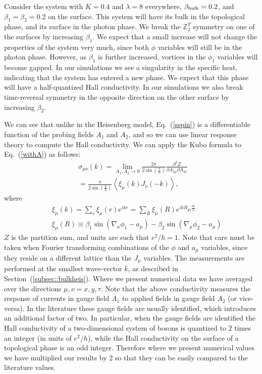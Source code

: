 \documentclass[prb,twocolumn]{revtex4-1}
\def\ztwot{\mathbb{Z}_2^T}
\begin{document}
Consider the system with $K=0.4$ and $\lambda=8$ everywhere, $\beta_{\rm bulk}=0.2$, and $\beta_{1}=\beta_{2}=0.2$ on the surface. This system will have its bulk in the topological phase, and its surface in the photon phase. We break the $\ztwot$ symmetry on one of the surfaces by increasing $\beta_{1}$. We expect that a small increase will not change the properties of the system very much, since both $\phi$ variables will still be in the photon phase.\cite{LesikAshvin2} However, as $\beta_1$ is further increased, vortices in the $\phi_1$ variables will become gapped. In our simulations we see a singularity in the specific heat, indicating that the system has entered a new phase. We expect that this phase will have a half-quantized Hall conductivity. In our simulations we also break time-reversal symmetry in the opposite direction on the other surface by increasing $\beta_2$. 

 We can see that unlike in the Heisenberg model, Eq.~(\ref{sspin}) is a differentiable function of the probing fields $A_1$ and $A_2$, and so we can use linear response theory to compute the Hall conductivity. We can apply the Kubo formula to Eq.~(\ref{withA}) as follows:
\begin{eqnarray}
&&\sigma_{\mu\nu}(k)=\lim_{A_1,A_2 \to 0}\frac{2\pi}{2\sin\left(\frac{\pi}{L}\right)}\frac{\partial^2 Z}{\partial A_{1\mu}\partial A_{2\nu}}~~~~~\\
&&=\frac{\pi}{2\sin\left(\frac{\pi}{L}\right)}\left\langle\xi_\mu(k)J_{\nu}(-k) \right\rangle,\nonumber
\end{eqnarray}
where
\begin{eqnarray}
&&\xi_\mu(k)=\sum_r \xi_\mu(r)e^{ikr}=\sum_R \xi_\mu(R)e^{ikR}e^{\frac{ik}{2}}\nonumber\\
&&\xi_\mu(R)\equiv\beta_1\sin(\nabla_u\phi_1-a_\mu)-\beta_2\sin(\nabla_\mu\phi_2-a_\mu)
\end{eqnarray}
$Z$ is the partition sum, and units are such that $e^2/h=1$. Note that care must be taken when Fourier transforming combinations of the $\phi$ and $a_\mu$ variables, since they reside on a different lattice than the $J_\mu$ variables. The measurements are performed at the smallest wave-vector $k$, as described in Section~(\ref{subsec::bulkheis}). Where we present numerical data we have averaged over the directions $\mu,\nu=x,y,\tau$. Note that the above conductivity measures the response of currents in gauge field $A_1$ to applied fields in gauge field $A_2$ (or vice-versa). In the literature these gauge fields are usually identified, which introduces an additional factor of two. In particular, when the gauge fields are identified the Hall conductivity of a two-dimensional system of bosons is quantized to $2$ times an integer (in units of $e^2/h$), while the Hall conductivity on the surface of a topological phase is an odd integer. Therefore where we present numerical values we have multiplied our results by $2$ so that they can be easily compared to the literature values.
\end{document}
